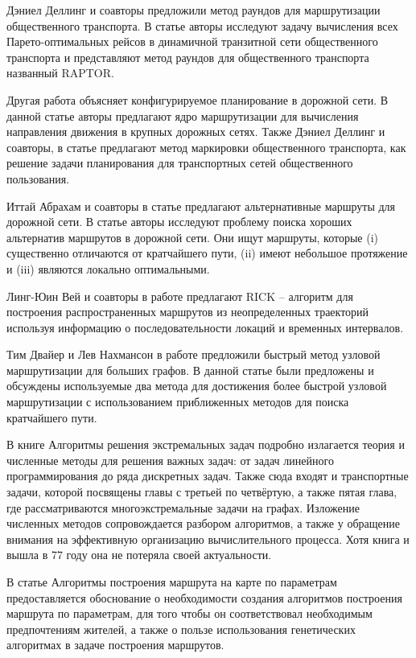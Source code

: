 Дэниел Деллинг и соавторы предложили метод раундов для маршрутизации общественного транспорта. В статье 
\cite{delling2014round} авторы исследуют задачу вычисления всех Парето-оптимальных рейсов в динамичной 
транзитной сети общественного транспорта и представляют метод раундов для общественного транспорта 
названный RAPTOR.

Другая работа \cite{delling2015customizable} объясняет конфигурируемое планирование в дорожной сети. В 
данной статье авторы предлагают ядро маршрутизации для вычисления направления движения в крупных дорожных 
сетях. Также Дэниел Деллинг и соавторы, в статье \cite{delling2015public} предлагают метод маркировки 
общественного транспорта, как решение задачи планирования для транспортных сетей общественного 
пользования.

Иттай Абрахам и соавторы в статье \cite{abraham2013alternative} предлагают альтернативные маршруты для 
дорожной сети. В статье авторы исследуют проблему поиска хороших альтернатив маршрутов в дорожной сети. 
Они ищут маршруты, которые (i) существенно отличаются от кратчайшего пути, (ii) имеют небольшое протяжение 
и (iii) являются локально оптимальными.

Линг-Юин Вей и соавторы в работе \cite{wei2012constructing} предлагают RICK -- алгоритм для построения 
распространенных маршрутов из неопределенных траекторий используя информацию о последовательности локаций
и временных интервалов.

Тим Двайер и Лев Нахмансон в работе \cite{dwyer2009fast} предложили быстрый метод узловой маршрутизации 
для больших графов. В данной статье были предложены и обсуждены используемые два метода для достижения 
более быстрой узловой маршрутизации с использованием приближенных методов для поиска кратчайшего пути.

В книге Алгоритмы решения экстремальных задач\cite{bib:56} подробно излагается теория и численные методы 
для решения важных задач: от задач линейного программирования до ряда дискретных задач. Также сюда входят 
и транспортные задачи, которой посвящены главы с третьей по четвёртую, а также пятая глава, где 
рассматриваются многоэкстремальные задачи на графах. Изложение численных методов сопровождается разбором 
алгоритмов, а также у обращение внимания на эффективную организацию вычислительного процесса. Хотя книга 
и вышла в 77 году она не потеряла своей актуальности.

В статье Алгоритмы построения маршрута на карте по параметрам\cite{bib:46} предоставляется обоснование 
о необходимости создания алгоритмов построения маршрута по параметрам, для того чтобы он соответствовал 
необходимым предпочтениям жителей, а также о пользе использования генетических алгоритмах в задаче 
построения маршрутов.

